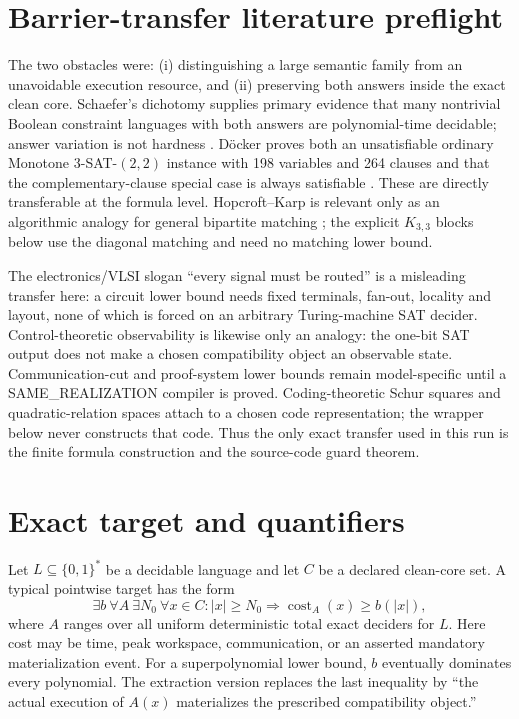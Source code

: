 \documentclass[11pt]{article}
\begin{document}
\section{Barrier-transfer literature preflight}

The two obstacles were: (i) distinguishing a large semantic family from an
unavoidable execution resource, and (ii) preserving both answers inside the
exact clean core.  Schaefer's dichotomy supplies primary evidence that many
nontrivial Boolean constraint languages with both answers are polynomial-time
decidable; answer variation is not hardness \cite{schaefer}.  D\"ocker proves
both an unsatisfiable ordinary Monotone 3-SAT-$(2,2)$ instance with 198
variables and 264 clauses and that the complementary-clause special case is
always satisfiable \cite{docker}.  These are directly transferable at the
formula level.  Hopcroft--Karp is relevant only as an algorithmic analogy for
general bipartite matching \cite{hk}; the explicit $K_{3,3}$ blocks below use
the diagonal matching and need no matching lower bound.

The electronics/VLSI slogan ``every signal must be routed'' is a misleading
transfer here: a circuit lower bound needs fixed terminals, fan-out, locality
and layout, none of which is forced on an arbitrary Turing-machine SAT decider.
Control-theoretic observability is likewise only an analogy: the one-bit SAT
output does not make a chosen compatibility object an observable state.
Communication-cut and proof-system lower bounds remain model-specific until a
SAME\_REALIZATION compiler is proved.  Coding-theoretic Schur squares and
quadratic-relation spaces attach to a chosen code representation; the wrapper
below never constructs that code.  Thus the only exact transfer used in this
run is the finite formula construction and the source-code guard theorem.

\section{Exact target and quantifiers}

Let $L\subseteq\{0,1\}^*$ be a decidable language and let $C$ be a declared
clean-core set.  A typical pointwise target has the form
\begin{equation}
 \exists b\ \forall A\ \exists N_0\ \forall x\in C:
 |x|\ge N_0\Longrightarrow
 \operatorname{cost}_{A}(x)\ge b(|x|),
 \tag{PW}
\end{equation}
where $A$ ranges over all uniform deterministic total exact deciders for $L$.
Here cost may be time, peak workspace, communication, or an asserted mandatory
materialization event.  For a superpolynomial lower bound, $b$ eventually
dominates every polynomial.  The extraction version replaces the last
inequality by ``the actual execution of $A(x)$ materializes the prescribed
compatibility object.''
\end{document}
